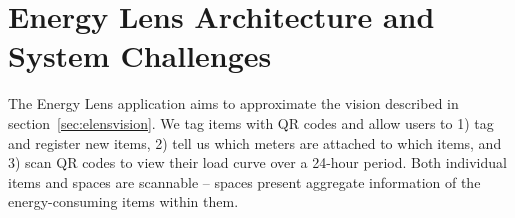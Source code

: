 




\section{Energy Lens Architecture and System Challenges}
The Energy Lens application aims to approximate the vision described in section~\ref{sec:elensvision}.  We tag
items with QR codes and allow users to 1) tag and register new items, 
2) tell us which meters are attached to which items, and 3) scan QR codes to view their load curve over a 
24-hour period.  Both individual items and spaces are scannable -- spaces present aggregate information
of the energy-consuming items within them.

